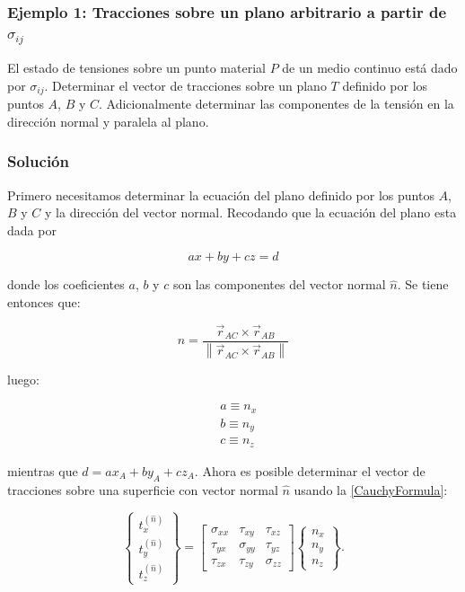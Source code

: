 \documentclass[../notas medios.tex]{subfiles}
\begin{document}
\subsubsection*{Ejemplo 1: Tracciones sobre un plano arbitrario a partir de $\sigma_{ij}$}
El estado de tensiones sobre un punto material $P$ de un medio continuo está
dado por $\sigma_{ij}$. Determinar el vector de tracciones sobre un plano $T$
definido por los puntos $A$, $B$ y $C$. Adicionalmente determinar las
componentes de la tensión en la dirección normal y paralela al plano.
\subsubsection*{Solución}
Primero necesitamos determinar la ecuación del plano definido por los puntos $A$, $B$ y $C$ y la dirección del vector normal. Recodando que la ecuación del plano esta dada por

\[ax+by+cz=d\]

donde los coeficientes $a$, $b$ y $c$ son las componentes del vector normal $\hat{n}$. Se tiene entonces que:

\[\hat n = \frac{{{{\vec r}_{AC}} \times {{\vec r}_{AB}}}}{{\left\| {{{\vec r}_{AC}} \times {{\vec r}_{AB}}} \right\|}}\]

luego:

\begin{align*}
&a \equiv {n_x}\\
&b \equiv {n_y}\\
&c \equiv {n_z}
\end{align*}

mientras que $d=a x_A+b y_A+c z_A$. Ahora es posible determinar el vector de tracciones sobre una superficie con vector normal $\hat{n}$ usando la \cref{CauchyFormula}:


\[
\left\{ {\begin{array}{*{20}{c}}
{t_x^{(\hat n)}}\\
{t_y^{(\hat n)}}\\
{t_z^{(\hat n)}}
\end{array}} \right\} = \left[ {\begin{array}{*{20}{c}}
{{\sigma _{xx}}}&{{\tau _{xy}}}&{{\tau _{xz}}}\\
{{\tau _{yx}}}&{{\sigma _{yy}}}&{{\tau _{yz}}}\\
{{\tau _{zx}}}&{{\tau _{zy}}}&{{\sigma _{zz}}}
\end{array}} \right]\left\{ {\begin{array}{*{20}{c}}
{{n_x}}\\
{{n_y}}\\
{{n_z}}
\end{array}} \right\}.
\]
\end{document}
